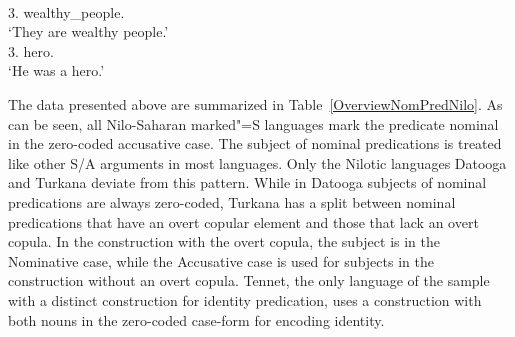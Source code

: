 \begin{exe}
\ex\label{DatNomPred}
\begin{xlist}
\ex\gll {}  \\
3\pl{}.\acc{} wealthy\_people.\acc{} \dem{}\\
\glt `They are wealthy people.'
\ex\gll {}   \\
3\sg{}.\abs{} \cop{} hero.\acc{} \dem{}\\
\glt `He was a hero.'
\end{xlist}
\end{exe}

The data presented above are summarized in Table~\ref{OverviewNomPredNilo}. 
As can be seen, all Nilo-Saharan marked"=S languages mark the predicate nominal in the zero-coded accusative case. 
The subject of nominal predications is treated like other S/A arguments in most languages. Only the Nilotic languages Datooga and Turkana deviate from this pattern. 
While in Datooga subjects of nominal predications are always zero-coded, Turkana has a split between nominal predications that have an overt copular element and those that lack an overt copula. 
In the construction with the overt copula, the subject is in the Nominative case, while the Accusative case is used for subjects in the construction without an overt copula. 
Tennet, the only language of the sample with a distinct construction for identity predication, uses a construction with both nouns in the zero-coded case-form for encoding identity.


